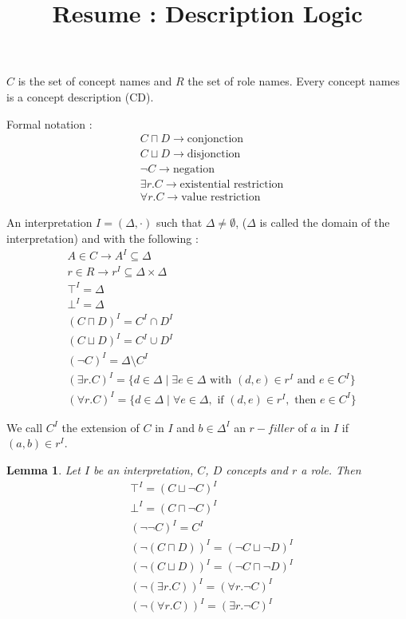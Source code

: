 \documentclass[a4paper,11pt]{report}
\title{Resume : Description Logic}
\begin{document}
\maketitle

$C$ is the set of concept names and $R$ the set of role names. Every concept names is a concept description (CD).

Formal notation :
\begin{align*}
& C \sqcap D \rightarrow \text{conjonction} \\
& C \sqcup D \rightarrow \text{disjonction} \\
& \neg C \rightarrow \text{negation} \\
& \exists r.C \rightarrow \text{existential restriction} \\
& \forall r.C \rightarrow \text{value restriction}
\end{align*}

An interpretation $I = (\Delta,\cdot )$ such that $\Delta \neq \emptyset$, ($\Delta$ is called the domain of the interpretation) and with the following :
\begin{align*}
& A \in C \rightarrow A^I \subseteq \Delta \\
& r \in R \rightarrow r^I \subseteq \Delta \times \Delta \\
& \top^I = \Delta \\
& \bot^I = \Delta \\
& (C \sqcap D)^I = C^I \cap D^I \\
& (C \sqcup D)^I = C^I \cup D^I  \\
& (\neg C)^I = \Delta \setminus C^I \\
& (\exists r.C)^I = \{d \in \Delta \mid \exists e \in \Delta \text{ with } (d,e) \in r^I \text{ and } e \in C^I \}\\
& (\forall r.C)^I = \{ d \in \Delta \mid \forall e \in \Delta, \text{ if } (d,e) \in r^I, \text{ then }e \in C^I \}
\end{align*}

We call $C^I$ the extension of $C$ in $I$ and $b \in \Delta^I$ an $r-filler$ of $a$ in $I$ if $(a,b) \in r^I$.

\newtheorem{Lemma}{Lemma}
\begin{Lemma}
Let $I$ be an interpretation, $C$, $D$ concepts and $r$ a role. Then
\begin{align*}
& \top^I = (C \sqcup \neg C)^I \\
& \bot^I = (C \sqcap \neg C)^I \\
& (\neg \neg C)^I = C^I \\
& (\neg(C \sqcap D))^I = (\neg C \sqcup \neg D)^I \\
& (\neg(C \sqcup D))^I = (\neg C \sqcap \neg D)^I \\
& (\neg(\exists r.C))^I = (\forall r.\neg C)^I \\
& (\neg(\forall r.C))^I = (\exists r.\neg C)^I
\end{align*}
\end{Lemma}
\end{document}
